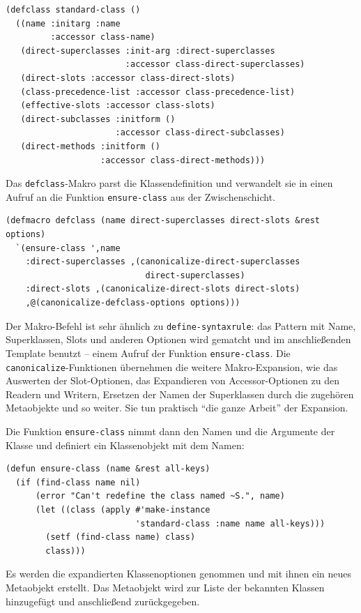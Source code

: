 \begin{lstlisting}
(defclass standard-class ()
  ((name :initarg :name
         :accessor class-name)
   (direct-superclasses :init-arg :direct-superclasses
                        :accessor class-direct-superclasses)
   (direct-slots :accessor class-direct-slots)
   (class-precedence-list :accessor class-precedence-list)
   (effective-slots :accessor class-slots)
   (direct-subclasses :initform ()
                      :accessor class-direct-subclasses)
   (direct-methods :initform ()
                   :accessor class-direct-methods)))
\end{lstlisting}

Das \texttt{defclass}-Makro parst die Klassendefinition und verwandelt sie in einen Aufruf an die Funktion \texttt{ensure-class} aus der Zwischenschicht. 

\begin{lstlisting}
(defmacro defclass (name direct-superclasses direct-slots &rest options)
  `(ensure-class ',name
    :direct-superclasses ,(canonicalize-direct-superclasses 
                            direct-superclasses)
    :direct-slots ,(canonicalize-direct-slots direct-slots)
    ,@(canonicalize-defclass-options options)))
\end{lstlisting}

Der Makro-Befehl ist sehr ähnlich zu \texttt{define-syntaxrule}: das Pattern mit Name, Superklassen, Slots und anderen Optionen wird gematcht und im anschließenden Template benutzt -- einem Aufruf der Funktion \texttt{ensure-class}. Die \texttt{canonicalize}-Funktionen übernehmen die weitere Makro-Expansion, wie das Auswerten der Slot-Optionen, das Expandieren von Accessor-Optionen zu den Readern und Writern, Ersetzen der Namen der Superklassen durch die zugehören Metaobjekte und so weiter. Sie tun praktisch ``die ganze Arbeit'' der Expansion.

Die Funktion \texttt{ensure-class} nimmt dann den Namen und die Argumente der Klasse und definiert ein Klassenobjekt mit dem Namen:

\begin{lstlisting}
(defun ensure-class (name &rest all-keys)
  (if (find-class name nil)
      (error "Can't redefine the class named ~S.", name)
      (let ((class (apply #'make-instance
                          'standard-class :name name all-keys)))
        (setf (find-class name) class)
        class)))
\end{lstlisting}

Es werden die expandierten Klassenoptionen genommen und mit ihnen ein neues Metaobjekt erstellt. Das Metaobjekt wird zur Liste der bekannten Klassen hinzugefügt und anschließend zurückgegeben. 

